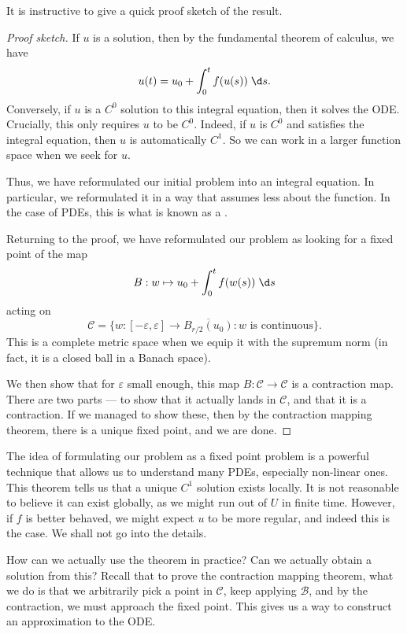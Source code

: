 \documentclass[a4paper]{article}
\begin{document}
It is instructive to give a quick proof sketch of the result.

\begin{proof}[Proof sketch]
  If $u$ is a solution, then by the fundamental theorem of calculus, we have
  \[
    u(t) = u_0 + \int_0^t f(u(s))\;\d s.
  \]
  Conversely, if $u$ is a $C^0$ solution to this integral equation, then it solves the ODE. Crucially, this only requires $u$ to be $C^0$. Indeed, if $u$ is $C^0$ and satisfies the integral equation, then $u$ is automatically $C^1$. So we can work in a larger function space when we seek for $u$.

  Thus, we have reformulated our initial problem into an integral equation. In particular, we reformulated it in a way that assumes less about the function. In the case of PDEs, this is what is known as a .

  Returning to the proof, we have reformulated our problem as looking for a fixed point of the map
  \[
    B: w \mapsto u_0+ \int_0^t f(w(s))\;\d s
  \]
  acting on
  \[
    \mathcal{C} = \{w: [-\varepsilon, \varepsilon] \to \overline{B_{r/2}(u_0)} : w\text{ is continuous}\}.
  \]
  This is a complete metric space when we equip it with the supremum norm (in fact, it is a closed ball in a Banach space).

  We then show that for $\varepsilon$ small enough, this map $B: \mathcal{C} \to \mathcal{C}$ is a contraction map. There are two parts --- to show that it actually lands in $\mathcal{C}$, and that it is a contraction. If we managed to show these, then by the contraction mapping theorem, there is a unique fixed point, and we are done.
\end{proof}

The idea of formulating our problem as a fixed point problem is a powerful technique that allows us to understand many PDEs, especially non-linear ones. This theorem tells us that a unique $C^1$ solution exists locally. It is not reasonable to believe it can exist globally, as we might run out of $U$ in finite time. However, if $f$ is better behaved, we might expect $u$ to be more regular, and indeed this is the case. We shall not go into the details.

How can we actually use the theorem in practice? Can we actually obtain a solution from this? Recall that to prove the contraction mapping theorem, what we do is that we arbitrarily pick a point in $\mathcal{C}$, keep applying $\mathcal{B}$, and by the contraction, we must approach the fixed point. This gives us a way to construct an approximation to the ODE.
\end{document}
